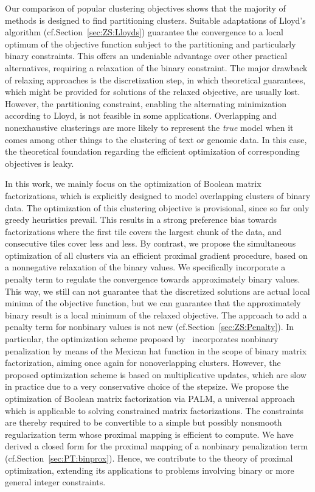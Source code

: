 Our comparison of popular clustering objectives shows that the majority of methods is designed to find partitioning clusters. Suitable adaptations of Lloyd's algorithm (cf.\@ Section~\ref{sec:ZS:Lloyds}) guarantee the convergence to a local optimum of the objective function subject to the partitioning and particularly binary constraints. This offers an undeniable advantage over other practical alternatives, requiring a relaxation of the binary constraint. The major drawback of relaxing approaches is the discretization step, in which theoretical guarantees, which might be provided for solutions of the relaxed objective, are usually lost. However, the partitioning constraint, enabling the alternating minimization according to Lloyd, is not feasible in some applications. Overlapping and nonexhaustive clusterings are more likely to represent the \emph{true} model when it comes among other things to the clustering of text or genomic data. In this case, the theoretical foundation regarding the efficient optimization of corresponding objectives is leaky.

In this work, we mainly focus on the optimization of Boolean matrix factorizations, which is explicitly designed to model overlapping clusters of binary data. The optimization of this clustering objective is provisional, since so far only greedy heuristics prevail. This results in a strong preference bias towards factorizations where the first tile covers the largest chunk of the data, and consecutive tiles cover less and less. By contrast, we propose the simultaneous optimization of all clusters via an efficient proximal gradient procedure, based on a nonnegative relaxation of the binary values. We specifically incorporate a penalty term to regulate the convergence towards approximately binary values. This way, we still can not guarantee that the discretized solutions are actual local minima of the objective function, but we can guarantee that the approximately binary result is a local minimum of the relaxed objective. The approach to add a penalty term for nonbinary values is not new (cf.\@ Section~\ref{sec:ZS:Penalty}). In particular, the optimization scheme proposed by~\cite{zhang2007binary} incorporates nonbinary penalization by means of the Mexican hat function in the scope of binary matrix factorization, aiming once again for nonoverlapping clusters. However, the proposed optimization scheme is based on multiplicative updates, which are slow in practice due to a very conservative choice of the stepsize. 
We propose the optimization of Boolean matrix factorization via PALM, a universal approach which is applicable to solving constrained matrix factorizations. The constraints are thereby required to be convertible to a simple but possibly nonsmooth regularization term whose proximal mapping is efficient to compute. We have derived a closed form for the proximal mapping of a nonbinary penalization term (cf.\@ Section~\ref{sec:PT:binprox}). Hence, we contribute to the theory of proximal optimization, extending its applications to problems involving binary or more general integer constraints.

